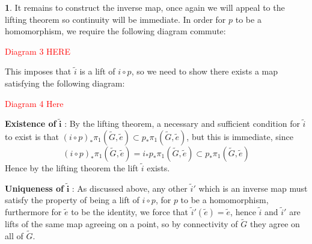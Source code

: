 \documentclass[10.5pt]{article}
\theoremstyle{definition}
\newtheorem{pb}{}
\begin{document}
\begin{pb}
        It remains to construct the inverse map, once again we will appeal to the lifting theorem so continuity will be immediate. In order for \(p\) to be a homomorphism, we require the following diagram commute:
        
        \textcolor{red}{Diagram 3 HERE}

        This imposes that \(\tilde{i}\) is a lift of \(i \circ p\), so we need to show there exists a map satisfying the following diagram:

        \textcolor{red}{Diagram 4 Here}

        \textbf{Existence of }\(\mathbf{\tilde{i}}\) :
        By the lifting theorem, a necessary and sufficient condition for \(\tilde{i}\) to exist is that \((i \circ p)_* \pi_1(\tilde{G},\tilde{e}) \subset p_*\pi_1(\tilde{G},\tilde{e})\), but this is immediate, since
        \[(i \circ p)_* \pi_1(\tilde{G},\tilde{e}) = i_*p_*\pi_1(\tilde{G},\tilde{e}) \subset p_*\pi_1(\tilde{G},\tilde{e})\]
        Hence by the lifting theorem the lift \(\tilde{i}\) exists.

        \textbf{Uniqueness of }\(\mathbf{\tilde{i}}\) : As discussed above, any other \(\tilde{i}'\) which is an inverse map must satisfy the property of being a lift of \(i \circ p\), for \(p\) to be a homomorphism, furthermore for \(\tilde{e}\) to be the identity, we force that \(\tilde{i}'(\tilde{e}) = \tilde{e}\), hence \(\tilde{i}\) and \(\tilde{i}'\) are lifts of the same map agreeing on a point, so by connectivity of \(\tilde{G}\) they agree on all of \(\tilde{G}\).


\end{pb}
\end{document}
